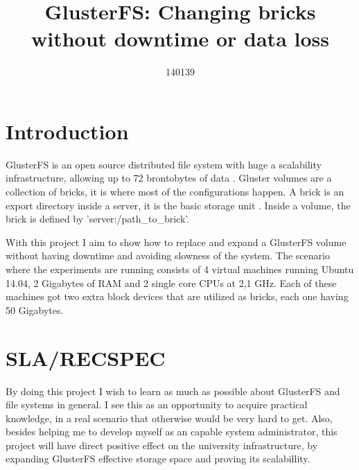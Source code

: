 

\title{GlusterFS: Changing bricks without downtime or data loss}
\author{140139}



\maketitle


\thispagestyle{empty}

\clearpage
{}
\setcounter{page}{1}
\tableofcontents

\clearpage
{}

\section{Introduction}

GlusterFS is an open source distributed file system with huge a scalability infrastructure, allowing up to 72 brontobytes of data \cite{GlusterFS:About:14}. Gluster volumes are a collection of bricks, it is where most of the configurations happen. A brick is an export directory inside a server, it is the basic storage unit \cite{GlusterFS:Glossary:14}. Inside a volume, the brick is defined by 'server:/path\_to\_brick'.

With this project I aim to show how to replace and expand a GlusterFS volume without having downtime and avoiding slowness of the system. The scenario where the experiments are running consists of 4 virtual machines running Ubuntu 14.04, 2 Gigabytes of RAM and 2 single core CPUs at 2,1 GHz. Each of these machines got two extra block devices that are utilized as bricks, each one having 50 Gigabytes.


\section{SLA/RECSPEC}

By doing this project I wish to learn as much as possible about GlusterFS and file systems in general. I see this as an opportunity to acquire practical knowledge, in a real scenario that otherwise would be very hard to get. Also, besides helping me to develop myself as an capable system administrator, this project will have direct positive effect on the university infrastructure, by expanding GlusterFS effective storage space and proving its scalabillity.

